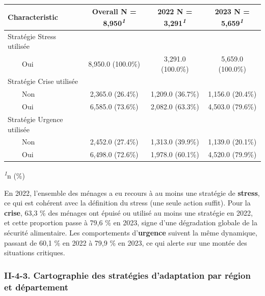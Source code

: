 \documentclass[
]{article}
\begin{document}
\begin{table}[!t]
\fontsize{9.8pt}{11.7pt}\selectfont
\begin{tabular*}{\linewidth}{@{\extracolsep{\fill}}lccc}
\toprule
\textbf{Characteristic} & \textbf{Overall}  N = 8,950\textsuperscript{\textit{1}} & \textbf{2022}  N = 3,291\textsuperscript{\textit{1}} & \textbf{2023}  N = 5,659\textsuperscript{\textit{1}} \\ 
\midrule\addlinespace[2.5pt]
Stratégie Stress utilisée &  &  &  \\ 
    Oui & 8,950.0 (100.0\%) & 3,291.0 (100.0\%) & 5,659.0 (100.0\%) \\ 
Stratégie Crise utilisée &  &  &  \\ 
    Non & 2,365.0 (26.4\%) & 1,209.0 (36.7\%) & 1,156.0 (20.4\%) \\ 
    Oui & 6,585.0 (73.6\%) & 2,082.0 (63.3\%) & 4,503.0 (79.6\%) \\ 
Stratégie Urgence utilisée &  &  &  \\ 
    Non & 2,452.0 (27.4\%) & 1,313.0 (39.9\%) & 1,139.0 (20.1\%) \\ 
    Oui & 6,498.0 (72.6\%) & 1,978.0 (60.1\%) & 4,520.0 (79.9\%) \\ 
\bottomrule
\end{tabular*}
\begin{minipage}{\linewidth}
\textsuperscript{\textit{1}}n (\%)\\
\end{minipage}
\end{table}

En 2022, l'ensemble des ménages a eu recours à au moins une stratégie de
\textbf{stress}, ce qui est cohérent avec la définition du stress (une
seule action suffit). Pour la \textbf{crise}, 63,3 \% des ménages ont
épuisé ou utilisé au moins une stratégie en 2022, et cette proportion
passe à 79,6 \% en 2023, signe d'une dégradation globale de la sécurité
alimentaire. Les comportements d'\textbf{urgence} suivent la même
dynamique, passant de 60,1 \% en 2022 à 79,9 \% en 2023, ce qui alerte
sur une montée des situations critiques.

\hypertarget{ii-4-3.-cartographie-des-stratuxe9gies-dadaptation-par-ruxe9gion-et-duxe9partement}{%
\subsubsection{II-4-3. Cartographie des stratégies d'adaptation par
région et
département}\label{ii-4-3.-cartographie-des-stratuxe9gies-dadaptation-par-ruxe9gion-et-duxe9partement}}
\end{document}
